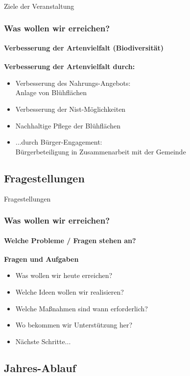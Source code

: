 \documentclass[aspectratio=169]{beamer}
\begin{document}
\begin{frame}{Ziele der Veranstaltung}
	\frametitle{Was wollen wir erreichen?} 
	\framesubtitle{Verbesserung der Artenvielfalt (Biodiversität)}

	\textbf{Verbesserung der Artenvielfalt durch:}
\begin{itemize} 
	\item 
		Verbesserung des Nahrungs-Angebots:	\\
		Anlage von Blühflächen \pause
	\item 
		Verbesserung der Nist-Möglichkeiten	 \pause
	\item 
		Nachhaltige Pflege der Blühflächen \pause
	\item 
		...durch Bürger-Engagement:\\
		Bürgerbeteiligung in Zusammenarbeit mit der Gemeinde%
\end{itemize}
\end{frame}

\subsection{Fragestellungen}

\begin{frame}{Fragestellungen}
\frametitle{Was wollen wir erreichen?} 
\framesubtitle{Welche Probleme / Fragen stehen an?}
\textbf{Fragen und Aufgaben}\\
\begin{itemize}
	\item 
		Was wollen wir heute erreichen? \pause 
	\item 
		Welche Ideen wollen wir realisieren? \pause
	\item 
		Welche Maßnahmen sind wann erforderlich? \pause
	\item 
		Wo bekommen wir Unterstützung her? \pause
	\item  
		Nächste Schritte...%
\end{itemize}
\end{frame}
\subsection[Jahr]{Jahres-Ablauf}
\end{document}
